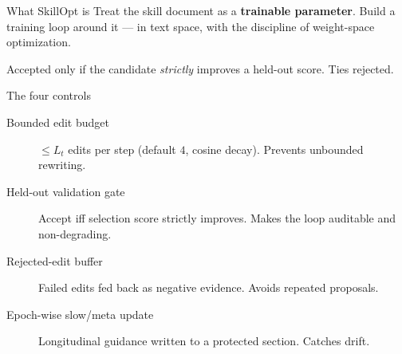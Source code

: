 \documentclass[aspectratio=169,11pt]{beamer}
\begin{document}
\begin{frame}{What SkillOpt is}
  Treat the skill document as a \textbf{trainable parameter}. Build a
  training loop around it --- in text space, with the discipline of
  weight-space optimization.

  \vspace{0.8em}
  \begin{center}
  \end{center}

  \vspace{0.4em}
  Accepted only if the candidate \emph{strictly} improves a held-out
  score. Ties rejected.
\end{frame}

\begin{frame}{The four controls}
  \begin{description}
    \item[Bounded edit budget] $\le L_t$ edits per step
    (default $4$, cosine decay). Prevents unbounded rewriting.
    \item[Held-out validation gate] Accept iff selection score strictly
    improves. Makes the loop auditable and non-degrading.
    \item[Rejected-edit buffer] Failed edits fed back as negative
    evidence. Avoids repeated proposals.
    \item[Epoch-wise slow/meta update] Longitudinal guidance written to
    a protected section. Catches drift.
  \end{description}
\end{frame}
\end{document}

